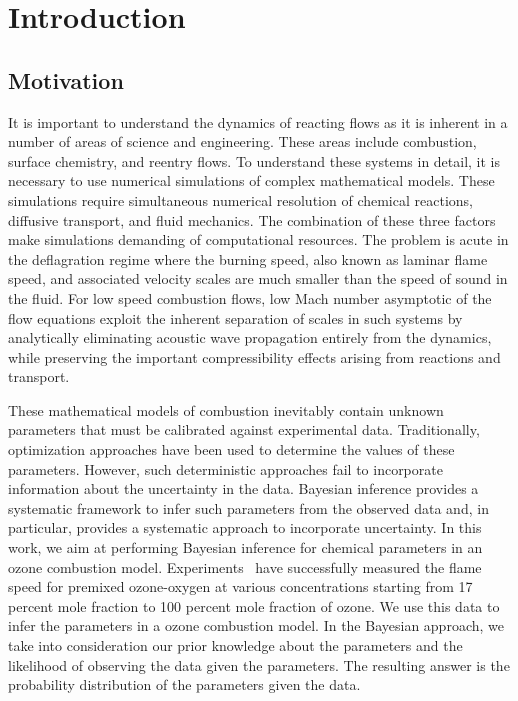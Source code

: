 
\chapter{Introduction}

\section{Motivation}
It is important to understand the dynamics of reacting flows as it is
inherent in a number of areas of science and engineering. These areas include
combustion, surface chemistry, and reentry flows. To understand these
systems in detail, it is necessary to use numerical simulations of
complex mathematical models. These
simulations require simultaneous numerical resolution of chemical
reactions, diffusive transport, and fluid mechanics. The combination
of these three factors make simulations demanding of computational
resources. The problem is acute in the deflagration regime where the
burning speed, also known as laminar flame speed, and associated
velocity scales are much smaller than the speed of sound in the fluid.
%
For low speed combustion flows, low Mach number asymptotic
of the flow equations exploit the inherent separation of scales in
such systems by analytically eliminating acoustic wave propagation
entirely from the dynamics, while preserving the important
compressibility effects arising from reactions and transport.

\bigskip


These mathematical models of combustion inevitably contain unknown
parameters that must be calibrated against experimental
data. Traditionally, optimization approaches have been used to
determine the values of these parameters. However,
such deterministic approaches fail to incorporate information about
the uncertainty in the data. Bayesian inference provides a systematic
framework to infer such parameters from the observed data and, in
particular, provides a systematic approach to incorporate uncertainty.
In this work, we aim at performing Bayesian inference for chemical
parameters in an ozone combustion model. Experiments~\cite{Streng} have
successfully measured the flame speed for premixed ozone-oxygen at
various concentrations starting from 17 percent mole fraction to 100 percent
mole fraction of ozone. We use this data to infer the
parameters in a ozone combustion model. In the Bayesian approach, we take
into consideration our prior knowledge about the parameters and the
likelihood of observing the data given the parameters. The resulting
answer is the probability distribution of the parameters given the
data.


